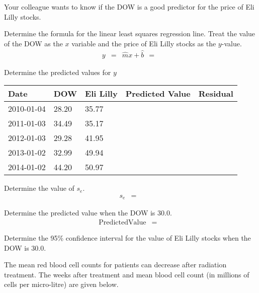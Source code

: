 \begin{problem}
\item Your colleague wants to know if the DOW is a good predictor for
  the price of Eli Lilly stocks.

  \begin{subproblem}
  \item Determine the formula for the linear least squares regression
    line. Treat the value of the DOW as the $x$ variable and the price
    of Eli Lilly stocks as the $y$-value.
    \begin{eqnarray*}
      y & = & \hat{m} x + \hat{b} ~~ = ~~ 
    \end{eqnarray*}
  \item Determine the predicted values for $y$  \\
    \begin{tabular}{l|l|l|l|l}
      Date & DOW & Eli Lilly & Predicted Value & Residual\\ \hline
      2010-01-04 & 28.20 & 35.77 & & \\
      2011-01-03 & 34.49 & 35.17 & &  \\
      2012-01-03 & 29.28 & 41.95 & &  \\
      2013-01-02 & 32.99 & 49.94 & &  \\
      2014-01-02 & 44.20 & 50.97 & & 
    \end{tabular}
  \item Determine the value of $s_e$.
    \begin{eqnarray*}
      s_e & = & 
    \end{eqnarray*}
  \item Determine the predicted value when the DOW is 30.0.
    \begin{eqnarray*}
      \mathrm{Predicted Value} & = & 
    \end{eqnarray*}
  \item Determine the 95\% confidence interval for the value of Eli
    Lilly stocks when the DOW is 30.0.
    \vfill
  \end{subproblem}

\clearpage

\item The mean red blood cell counts for patients can decrease after
  radiation treatment. The weeks after treatment and mean blood cell
  count (in millions of cells per micro-litre) are given below.


\end{problem}
